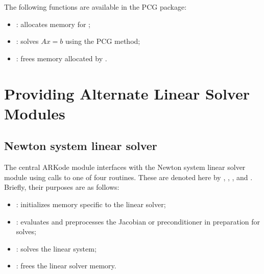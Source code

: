 \documentclass[letterpaper,10pt,english]{sphinxmanual}
\begin{document}
The following functions are available in the PCG package:
\begin{itemize}
\item {} 
: allocates memory for ;

\item {} 
: solves $Ax = b$ using the PCG method;

\item {} 
: frees memory allocated by .

\end{itemize}


\section{Providing Alternate Linear Solver Modules}
\label{linear_solvers/custom:providing-alternate-linear-solver-modules}\label{linear_solvers/custom::doc}\label{linear_solvers/custom:linearsolvers-custom}

\subsection{Newton system linear solver}
\label{linear_solvers/custom:newton-system-linear-solver}
The central ARKode module interfaces with the Newton system linear
solver module using calls to one of four routines. These are denoted
here by {\hyperref[linear_solvers/custom:linit]{}}, {\hyperref[linear_solvers/custom:lsetup]{}}, {\hyperref[linear_solvers/custom:lsolve]{}}, and
{\hyperref[linear_solvers/custom:lfree]{}}. Briefly, their purposes are as follows:
\begin{itemize}
\item {} 
{\hyperref[linear_solvers/custom:linit]{}}: initializes memory specific to the linear solver;

\item {} 
{\hyperref[linear_solvers/custom:lsetup]{}}: evaluates and preprocesses the Jacobian or
preconditioner in preparation for solves;

\item {} 
{\hyperref[linear_solvers/custom:lsolve]{}}: solves the linear system;

\item {} 
{\hyperref[linear_solvers/custom:lfree]{}}: frees the linear solver memory.

\end{itemize}
\end{document}
